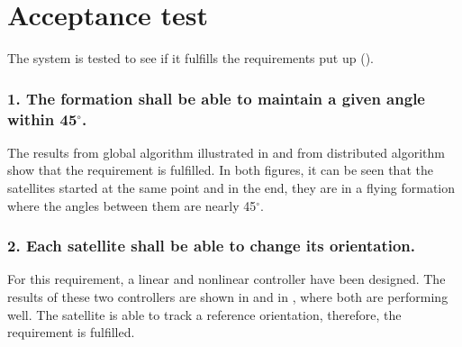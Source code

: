\chapter{Acceptance test} \label{chap:acceptanceTest}
The system is tested to see if it fulfills the requirements put up ().

\subsection{1. The formation shall be able to maintain a given angle within 45$^{\circ}$.}
The results from global algorithm illustrated in  and from distributed algorithm  show that the requirement is fulfilled. In both figures, it can be seen that the satellites started at the same point and in the end, they are in a flying formation where the angles between them are nearly 45$^{\circ}$.
\subsection{2. Each satellite shall be able to change its orientation.}
For this requirement, a linear and nonlinear controller have been designed. The results of these two controllers are shown in  and in , where both are performing well. The satellite is able to track a reference orientation, therefore, the requirement is fulfilled.


